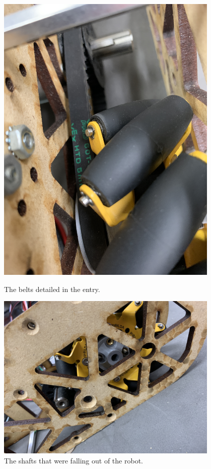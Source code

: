 \begin{figure}[ht]
\centering
\begin{minipage}[b]{.48\textwidth}
  \centering
  \includegraphics[width=0.95\textwidth]{Meetings/September/09-16-21/9-16-21_Hardware_Image1 - Nathan Forrer.JPG}
  \caption{The belts detailed in the entry.}
  \label{fig:pic1}
\end{minipage}%
\hfill%
\begin{minipage}[b]{.48\textwidth}
  \centering
  \includegraphics[width=0.95\textwidth]{Meetings/September/09-16-21/9-16-21_Hardware_Image2 - Nathan Forrer.JPG}
  \caption{The shafts that were falling out of the robot.}
  \label{fig:pic2}
\end{minipage}
\end{figure}

